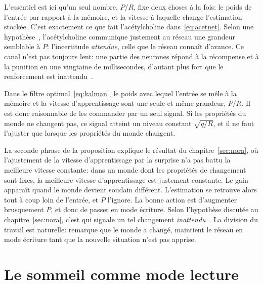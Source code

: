L'essentiel est ici qu'un seul nombre, $P/R$, fixe deux choses à la fois: le poids de l'entrée par rapport à la mémoire, et la vitesse à laquelle change l'estimation stockée. C'est exactement ce que fait l'acétylcholine dans~\eqref{eq:acetnet}. Selon une hypothèse~\cite{YuDayan2005}, l'acétylcholine communique justement au réseau une grandeur semblable à $P$: l'incertitude \emph{attendue}, celle que le réseau connaît d'avance. Ce canal n'est pas toujours lent: une partie des neurones  répond à la récompense et à la punition en une vingtaine de millisecondes, d'autant plus fort que le renforcement est inattendu~\cite{Hangya2015}.

\begin{keyblock}
\begin{proposition}
\label{prop:kalman}
Dans le filtre optimal~\eqref{eq:kalman}, le poids avec lequel l'entrée se mêle à la mémoire et la vitesse d'apprentissage sont une seule et même grandeur, $P/R$. Il est donc raisonnable de les commander par un seul signal. Si les propriétés du monde ne changent pas, ce signal atteint un niveau constant $\sqrt{q/R}$, et il ne faut l'ajuster que lorsque les propriétés du monde changent.
\end{proposition}
\end{keyblock}

La seconde phrase de la proposition explique le résultat du chapitre~\ref{sec:nora}, où l'ajustement de la vitesse d'apprentissage par la surprise n'a pas battu la meilleure vitesse constante: dans un monde dont les propriétés de changement sont fixes, la meilleure vitesse d'apprentissage est justement constante. Le gain apparaît quand le monde devient soudain différent. L'estimation se retrouve alors tout à coup loin de l'entrée, et $P$ l'ignore. La bonne action est d'augmenter brusquement $P$, et donc de passer en mode écriture. Selon l'hypothèse discutée au chapitre~\ref{sec:nora}, c'est  qui signale un tel changement \emph{inattendu}~\cite{YuDayan2005}. La division du travail est naturelle:  remarque que le monde a changé,  maintient le réseau en mode écriture tant que la nouvelle situation n'est pas apprise.

\section{Le sommeil comme mode lecture}

